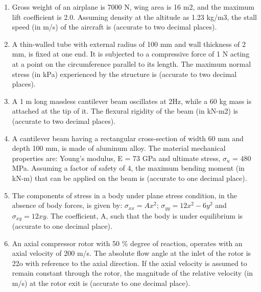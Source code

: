 \documentclass[journal,12pt,onecolumn]{IEEEtran}
\theoremstyle{remark}
\begin{document}
\begin{enumerate}
    \item Gross weight of an airplane is 7000 N, wing area is 16 m2, and the maximum lift coefficient is 2.0. Assuming density at the altitude as 1.23 kg/m3, the stall speed (in m/s) of the aircraft is \underline{\hspace{2cm}} (accurate to two decimal places).
    \hfill{}

    \item A thin-walled tube with external radius of 100 mm and wall thickness of 2 mm, is fixed at one end. It is subjected to a compressive force of 1 N acting at a point on the circumference parallel to its length. The maximum normal stress (in kPa) experienced by the structure is \underline{\hspace{2cm}} (accurate to two decimal places).
    \hfill{}

    \item A 1 m long massless cantilever beam oscillates at 2Hz, while a 60 kg mass is attached at the tip of it. The flexural rigidity of the beam (in kN-m2) is \underline{\hspace{2cm}} (accurate to two decimal places).
    \hfill{}

    \item A cantilever beam having a rectangular cross-section of width 60 mm and depth 100 mm, is made of aluminum alloy. The material mechanical properties are: Young's modulus, E = 73 GPa and ultimate stress, $\sigma_{u}$ = 480 MPa. Assuming a factor of safety of 4, the maximum bending moment (in kN-m) that can be applied on the beam is \underline{\hspace{2cm}} (accurate to one decimal place).
    \hfill{}

    \item The components of stress in a body under plane stress condition, in the absence of body forces, is given by: $\sigma_{xx} = Ax^{2}$; $\sigma_{yy} = 12x^{2} - 6y^{2}$ and $\sigma_{xy} = 12xy$. The coefficient, A, such that the body is under equilibrium is \underline{\hspace{2cm}} (accurate to one decimal place).
    \hfill{}

    \item An axial compressor rotor with 50 \% degree of reaction, operates with an axial velocity of 200 m/s. The absolute flow angle at the inlet of the rotor is 22o with reference to the axial direction. If the axial velocity is assumed to remain constant through the rotor, the magnitude of the relative velocity (in m/s) at the rotor exit is \underline{\hspace{2cm}} (accurate to one decimal place).
    \hfill{}


\end{enumerate}
\end{document}
